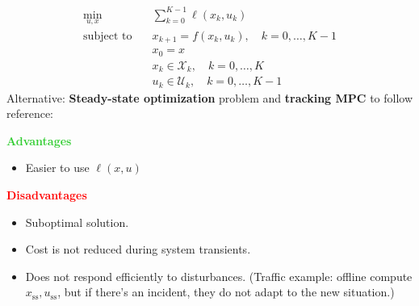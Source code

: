 \begin{align*}
    \min_{u, x} \quad & \sum_{k=0}^{K-1} \ell(x_k, u_k) \\
    \text{subject to} \quad & x_{k+1} = f(x_k, u_k), \quad k = 0, \ldots, K-1 \\
    & x_0 = x \\
    & x_k \in \mathcal{X}_k, \quad k = 0, \ldots, K \\
    & u_k \in \mathcal{U}_k, \quad k = 0, \ldots, K-1
\end{align*}
Alternative: \textbf{Steady-state optimization} problem and \textbf{tracking MPC} to follow reference:\\
\begin{minipage}[t]{0.48\textwidth}
    \textbf{\textcolor{LimeGreen}{Advantages}}
    \begin{itemize}
        \item Easier to use $\ell(x,u)$
    \end{itemize}
\end{minipage}
\begin{minipage}[t]{0.48\textwidth}
    \textbf{\textcolor{red}{Disadvantages}}
    \begin{itemize}
        \item Suboptimal solution.
        \item Cost is not reduced during system transients.
        \item Does not respond efficiently to disturbances. (Traffic example: offline compute $x_\mathrm{ss}, u_\mathrm{ss}$, but if there's an incident, they do not adapt to the new situation.)
    \end{itemize}
\end{minipage}\\
